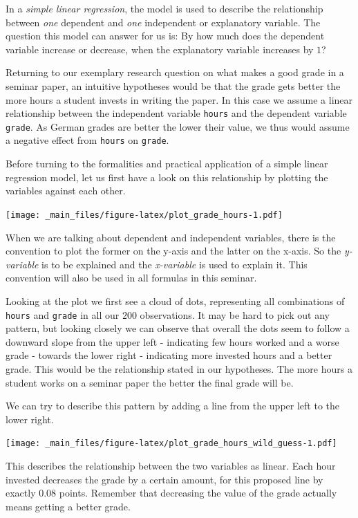 \documentclass[
]{book}
\begin{document}
In a \emph{simple linear regression}, the model is used to describe the relationship
between \emph{one} dependent and \emph{one} independent or explanatory variable. The
question this model can answer for us is: By how much does the dependent
variable increase or decrease, when the explanatory variable increases by \(1\)?

Returning to our exemplary research question on what makes a good grade in a
seminar paper, an intuitive hypotheses would be that the grade gets better the
more hours a student invests in writing the paper. In this case we assume a
linear relationship between the independent variable \texttt{hours} and the dependent
variable \texttt{grade}. As German grades are better the lower their value, we thus
would assume a negative effect from \texttt{hours} on \texttt{grade}.

Before turning to the formalities and practical application of a simple linear
regression model, let us first have a look on this relationship by plotting the
variables against each other.

\texttt{[image: \_main\_files/figure-latex/plot\_grade\_hours-1.pdf]}

When we are talking about dependent and independent variables, there is the
convention to plot the former on the y-axis and the latter on the x-axis. So the
\emph{y-variable} is to be explained and the \emph{x-variable} is used to explain it.
This convention will also be used in all formulas in this seminar.

Looking at the plot we first see a cloud of dots, representing all combinations
of \texttt{hours} and \texttt{grade} in all our \(200\) observations. It may be hard to pick out
any pattern, but looking closely we can observe that overall the dots seem to
follow a downward slope from the upper left - indicating few hours worked and a
worse grade - towards the lower right - indicating more invested hours and a
better grade. This would be the relationship stated in our hypotheses. The more
hours a student works on a seminar paper the better the final grade will be.

We can try to describe this pattern by adding a line from the upper left to the
lower right.

\texttt{[image: \_main\_files/figure-latex/plot\_grade\_hours\_wild\_guess-1.pdf]}

This describes the relationship between the two variables as linear. Each hour
invested decreases the grade by a certain amount, for this proposed line by
exactly \(0.08\) points. Remember that decreasing the value of the grade actually
means getting a better grade.
\end{document}
